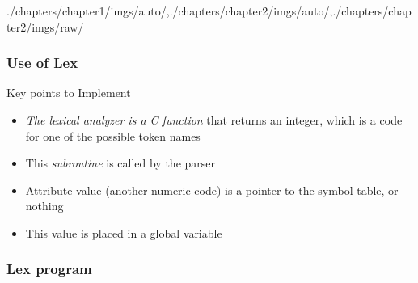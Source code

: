 \begin{graphicspathcontext}{{./chapters/chapter1/imgs/auto/},{./chapters/chapter2/imgs/auto/},{./chapters/chapter2/imgs/raw/}}
\begin{bibunit}[apalike]
\subsubsection{Use of Lex}
\subsubsectiontableofcontentslide*


\begin{frame}[background=8]{{Key points} to Implement }
	\begin{itemize}
		\item \emph{The lexical analyzer is a C function} that returns an integer, which is a code for one of the possible token names
		\vfill
		\item This \emph{subroutine} is called by the parser
		\vfill
		\item Attribute value (another numeric code) is a pointer to the symbol table, or nothing
		\item This value is placed in a global variable 
	\end{itemize}
\end{frame}

\subsubsection{Lex program}


\end{bibunit}
\end{graphicspathcontext}

